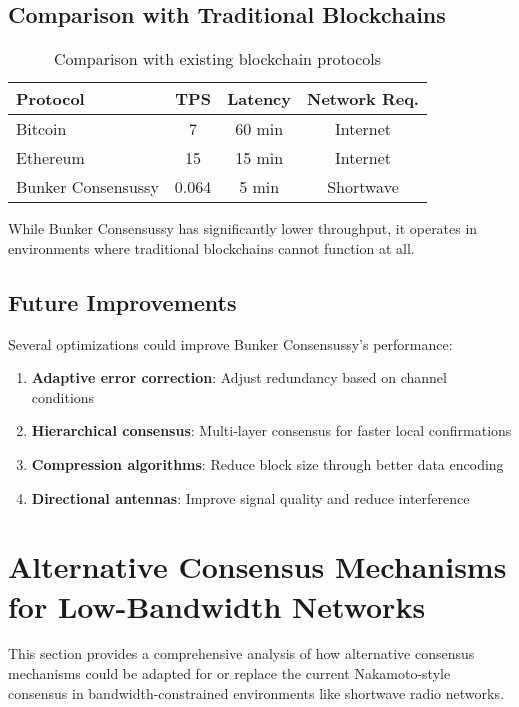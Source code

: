 \documentclass[11pt,a4paper]{article}
\begin{document}
\subsection{Comparison with Traditional Blockchains}

\begin{table}[h]
\centering
\caption{Comparison with existing blockchain protocols}
\begin{tabular}{@{}lccc@{}}
\toprule
Protocol & TPS & Latency & Network Req. \\
\midrule
Bitcoin & 7 & 60 min & Internet \\
Ethereum & 15 & 15 min & Internet \\
Bunker Consensussy & 0.064 & 5 min & Shortwave \\
\bottomrule
\end{tabular}
\end{table}

While Bunker Consensussy has significantly lower throughput, it operates in environments where traditional blockchains cannot function at all.

\subsection{Future Improvements}

Several optimizations could improve Bunker Consensussy's performance:

\begin{enumerate}
\item \textbf{Adaptive error correction}: Adjust redundancy based on channel conditions
\item \textbf{Hierarchical consensus}: Multi-layer consensus for faster local confirmations
\item \textbf{Compression algorithms}: Reduce block size through better data encoding
\item \textbf{Directional antennas}: Improve signal quality and reduce interference
\end{enumerate}

\section{Alternative Consensus Mechanisms for Low-Bandwidth Networks}

This section provides a comprehensive analysis of how alternative consensus mechanisms could be adapted for or replace the current Nakamoto-style consensus in bandwidth-constrained environments like shortwave radio networks.
\end{document}
